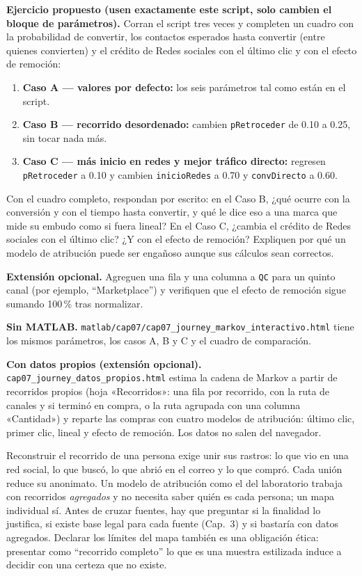 \begin{cajaLaboratorio}
\textbf{Ejercicio propuesto (usen exactamente este script, solo cambien el
bloque de parámetros).} Corran el script tres veces y completen un cuadro con
la probabilidad de convertir, los contactos esperados hasta convertir (entre
quienes convierten) y el crédito de Redes sociales con el último clic y con el
efecto de remoción:
\begin{enumerate}
  \item \textbf{Caso A — valores por defecto:} los seis parámetros tal como
  están en el script.
  \item \textbf{Caso B — recorrido desordenado:} cambien \texttt{pRetroceder}
  de 0.10 a 0.25, sin tocar nada más.
  \item \textbf{Caso C — más inicio en redes y mejor tráfico directo:}
  regresen \texttt{pRetroceder} a 0.10 y cambien \texttt{inicioRedes} a 0.70 y
  \texttt{convDirecto} a 0.60.
\end{enumerate}
Con el cuadro completo, respondan por escrito: en el Caso B, ¿qué ocurre con
la conversión y con el tiempo hasta convertir, y qué le dice eso a una marca
que mide su embudo como si fuera lineal? En el Caso C, ¿cambia el crédito de
Redes sociales con el último clic? ¿Y con el efecto de remoción? Expliquen
por qué un modelo de atribución puede ser engañoso aunque sus cálculos sean
correctos.

\textbf{Extensión opcional.} Agreguen una fila y una columna a \texttt{QC}
para un quinto canal (por ejemplo, \enquote{Marketplace}) y verifiquen que el
efecto de remoción sigue sumando 100\,\% tras normalizar.

\textbf{Sin MATLAB.}
\texttt{matlab/cap07/cap07\_journey\_markov\_interactivo.html} tiene los mismos
parámetros, los casos A, B y C y el cuadro de comparación.

\textbf{Con datos propios (extensión opcional).}
\texttt{cap07\_journey\_datos\_propios.html}
estima la cadena de Markov a partir de recorridos propios (hoja «Recorridos»: una fila por recorrido, con la ruta de canales y si terminó en compra, o la ruta agrupada con una columna «Cantidad») y reparte las compras con cuatro modelos de atribución: último clic, primer clic, lineal y efecto de remoción. Los datos no salen del navegador.
\end{cajaLaboratorio}

\begin{cajaEtica}
Reconstruir el recorrido de una persona exige unir sus rastros: lo que vio en
una red social, lo que buscó, lo que abrió en el correo y lo que compró. Cada
unión reduce su anonimato. Un modelo de atribución como el del laboratorio
trabaja con recorridos \emph{agregados} y no necesita saber quién es cada
persona; un mapa individual sí. Antes de cruzar fuentes, hay que preguntar si
la finalidad lo justifica, si existe base legal para cada fuente (Cap.~3) y si
bastaría con datos agregados. Declarar los límites del mapa también es una
obligación ética: presentar como \enquote{recorrido completo} lo que es una
muestra estilizada induce a decidir con una certeza que no existe.
\end{cajaEtica}

